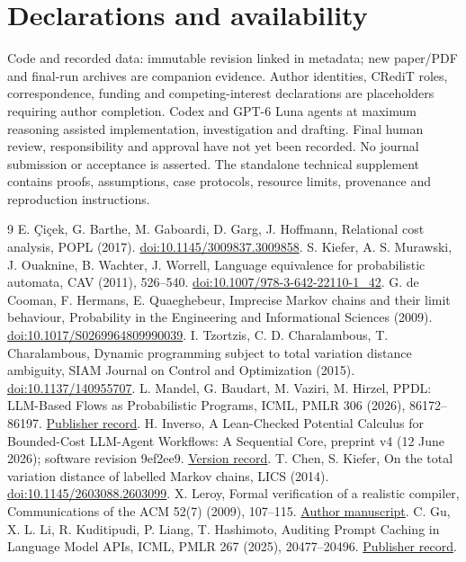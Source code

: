 \documentclass[preprint,12pt,a4paper]{elsarticle}
\begin{document}
\section*{Declarations and availability}
Code and recorded data: immutable revision linked in metadata; new paper/PDF and final-run archives are companion evidence. Author identities, CRediT roles, correspondence, funding and competing-interest declarations are placeholders requiring author completion. Codex and GPT-6 Luna agents at maximum reasoning assisted implementation, investigation and drafting. Final human review, responsibility and approval have not yet been recorded. No journal submission or acceptance is asserted. The standalone technical supplement contains proofs, assumptions, case protocols, resource limits, provenance and reproduction instructions.

\newpage
\begin{thebibliography}{9}
 E. \c{C}i\c{c}ek, G. Barthe, M. Gaboardi, D. Garg, J. Hoffmann, Relational cost analysis, POPL (2017). \href{https://doi.org/10.1145/3009837.3009858}{doi:10.1145/3009837.3009858}.
 S. Kiefer, A. S. Murawski, J. Ouaknine, B. Wachter, J. Worrell, Language equivalence for probabilistic automata, CAV (2011), 526--540. \href{https://doi.org/10.1007/978-3-642-22110-1_42}{doi:10.1007/978-3-642-22110-1\_42}.
 G. de Cooman, F. Hermans, E. Quaeghebeur, Imprecise Markov chains and their limit behaviour, Probability in the Engineering and Informational Sciences (2009). \href{https://doi.org/10.1017/S0269964809990039}{doi:10.1017/S0269964809990039}.
 I. Tzortzis, C. D. Charalambous, T. Charalambous, Dynamic programming subject to total variation distance ambiguity, SIAM Journal on Control and Optimization (2015). \href{https://doi.org/10.1137/140955707}{doi:10.1137/140955707}.
 L. Mandel, G. Baudart, M. Vaziri, M. Hirzel, PPDL: LLM-Based Flows as Probabilistic Programs, ICML, PMLR 306 (2026), 86172--86197. \href{https://proceedings.mlr.press/v306/mandel26a.html}{Publisher record}.
 H. Inverso, A Lean-Checked Potential Calculus for Bounded-Cost LLM-Agent Workflows: A Sequential Core, preprint v4 (12 June 2026); software revision 9ef2ee9. \href{https://doi.org/10.5281/zenodo.20663552}{Version record}.
 T. Chen, S. Kiefer, On the total variation distance of labelled Markov chains, LICS (2014). \href{https://doi.org/10.1145/2603088.2603099}{doi:10.1145/2603088.2603099}.
 X. Leroy, Formal verification of a realistic compiler, Communications of the ACM 52(7) (2009), 107--115. \href{https://xavierleroy.org/publi/compcert-CACM.pdf}{Author manuscript}.
 C. Gu, X. L. Li, R. Kuditipudi, P. Liang, T. Hashimoto, Auditing Prompt Caching in Language Model APIs, ICML, PMLR 267 (2025), 20477--20496. \href{https://proceedings.mlr.press/v267/gu25b.html}{Publisher record}.
\end{thebibliography}
\end{document}
